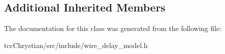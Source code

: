 \subsection*{Additional Inherited Members}


The documentation for this class was generated from the following file\-:\begin{DoxyCompactItemize}
\item 
tcc\-Chrystian/src/include/wire\-\_\-delay\-\_\-model.\-h\end{DoxyCompactItemize}
